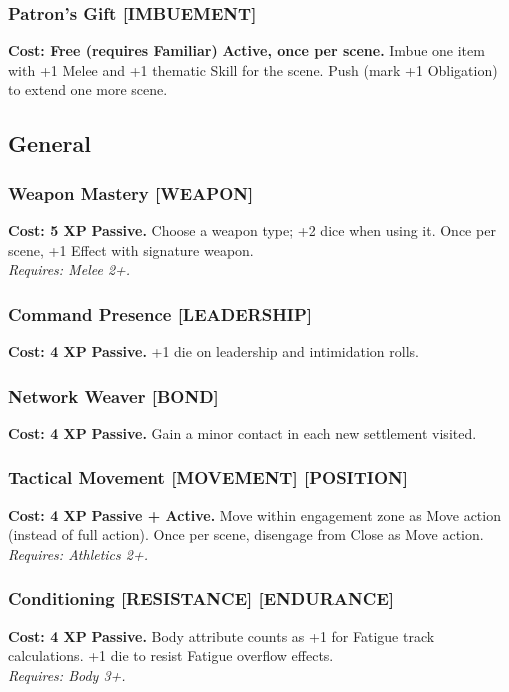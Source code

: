 \subsubsection*{Patron's Gift \textnormal{[IMBUEMENT]}}
\label{talent:patrons-gift}
\textbf{Cost: Free (requires Familiar)} \textbf{Active, once per scene.} Imbue one item with +1 Melee and +1 thematic Skill for the scene. Push (mark +1 Obligation) to extend one more scene.

\subsection*{General}
\label{sec:major-general}

\subsubsection*{Weapon Mastery \textnormal{[WEAPON]}}
\label{talent:weapon-mastery}
\textbf{Cost: 5 XP} \textbf{Passive.} Choose a weapon type; +2 dice when using it. Once per scene, +1 Effect with signature weapon. \\
\textit{Requires: Melee 2+.}

\subsubsection*{Command Presence \textnormal{[LEADERSHIP]}}
\label{talent:command-presence}
\textbf{Cost: 4 XP} \textbf{Passive.} +1 die on leadership and intimidation rolls.

\subsubsection*{Network Weaver \textnormal{[BOND]}}
\label{talent:network-weaver}
\textbf{Cost: 4 XP} \textbf{Passive.} Gain a minor contact in each new settlement visited.

\subsubsection*{Tactical Movement \textnormal{[MOVEMENT] [POSITION]}}
\label{talent:tactical-movement}
\textbf{Cost: 4 XP} \textbf{Passive + Active.} Move within engagement zone as Move action (instead of full action). Once per scene, disengage from Close as Move action. \\
\textit{Requires: Athletics 2+.}

\subsubsection*{Conditioning \textnormal{[RESISTANCE] [ENDURANCE]}}
\label{talent:conditioning}
\textbf{Cost: 4 XP} \textbf{Passive.} Body attribute counts as +1 for Fatigue track calculations. +1 die to resist Fatigue overflow effects. \\
\textit{Requires: Body 3+.}

